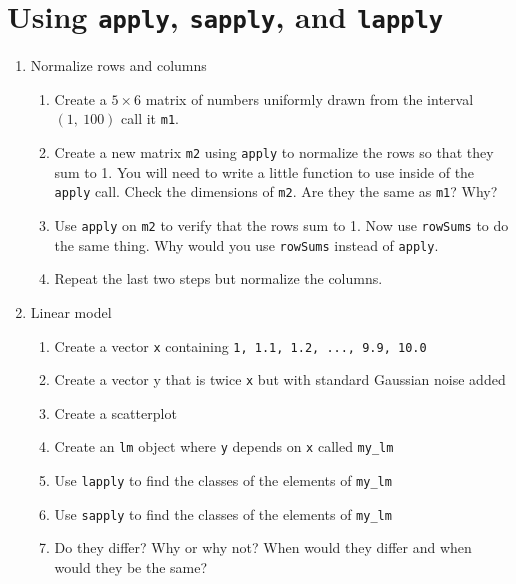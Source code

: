 \documentclass{article}
\begin{document}
\section*{Using \texttt{apply}, \texttt{sapply}, and \texttt{lapply}}

\begin{enumerate}

\item Normalize rows and columns
    \begin{enumerate}
    \item Create a $5\times 6$ matrix of numbers uniformly drawn from the
          interval $(1,\ 100)$ call it \texttt{m1}.
    \item Create a new matrix \texttt{m2} using \texttt{apply} to normalize
          the rows so that they sum to 1. You will need to write a little
          function to use inside of the \texttt{apply} call. Check
          the dimensions of \texttt{m2}.  Are they the same as \texttt{m1}?
          Why?
    \item Use \texttt{apply} on \texttt{m2} to verify that the rows sum to
          1.  Now use \texttt{rowSums} to do the same thing.  Why would you
          use \texttt{rowSums} instead of \texttt{apply}.
    \item Repeat the last two steps but normalize the columns.
    \end{enumerate}

\item Linear model
    \begin{enumerate}
    \item Create a vector \texttt{x} containing \texttt{1, 1.1, 1.2, ..., 9.9, 10.0}
    \item Create a vector y that is twice \texttt{x} but with standard Gaussian
          noise added
    \item Create a scatterplot
    \item Create an \texttt{lm} object where \texttt{y} depends on \texttt{x} called
          \texttt{my\_lm}
    \item Use \texttt{lapply} to find the classes of the elements of \texttt{my\_lm}
    \item Use \texttt{sapply} to find the classes of the elements of \texttt{my\_lm}
    \item Do they differ?  Why or why not?  When would they differ and when would
          they be the same?
    \end{enumerate}

\end{enumerate}
\end{document}
